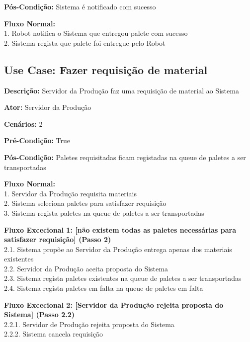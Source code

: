 \documentclass[11pt]{article}
\begin{document}
\textbf{Pós-Condição:} Sistema é notificado com sucesso

\textbf{Fluxo Normal:}\\
        1. Robot notifica o Sistema que entregou palete com sucesso\\
	    2. Sistema regista que palete foi entregue pelo Robot


\vspace{4cm}


\subsection{Use Case: Fazer requisição de material}

\textbf{Descrição:} Servidor da Produção faz uma requisição de material ao Sistema

\textbf{Ator:} Servidor da Produção

\textbf{Cenários:} 2

\textbf{Pré-Condição:} True

\textbf{Pós-Condição:} Paletes requisitadas ficam registadas na queue de paletes a ser transportadas

\textbf{Fluxo Normal:}\\
        1. Servidor da Produção requisita materiais\\
    	2. Sistema seleciona paletes para satisfazer requisição\\
    	3. Sistema regista paletes na queue de paletes a ser transportadas
        
\textbf{Fluxo Excecional 1: [não existem todas as paletes necessárias para satisfazer requisição] (Passo 2)}\\
        2.1. Sistema propõe ao Servidor da Produção entrega apenas dos materiais existentes\\
    	2.2. Servidor da Produção aceita proposta do Sistema\\
    	2.3. Sistema regista paletes existentes na queue de paletes a ser transportadas\\
    	2.4. Sistema regista paletes em falta na queue de paletes em falta
        
\textbf{Fluxo Excecional 2: [Servidor da Produção rejeita proposta do Sistema] (Passo 2.2)}\\
        2.2.1. Servidor de Produção rejeita proposta do Sistema\\
        2.2.2. Sistema cancela requisição
        
        
\vspace{3cm}
\end{document}
